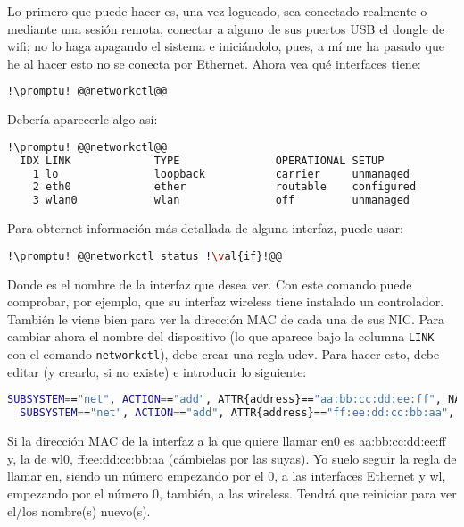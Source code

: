 Lo primero que puede hacer es, una vez logueado, sea conectado realmente o mediante una sesión remota, conectar
a alguno de sus puertos USB el dongle de wifi; no lo haga apagando el sistema e iniciándolo, pues, a mí me ha
pasado que he al hacer esto no se conecta por Ethernet. Ahora vea qué interfaces tiene:

\begin{lstlisting}[gobble=2,language=bash,style=bashinteract,escapechar=!]
  !\promptu! @@networkctl@@
\end{lstlisting}

\noindent Debería aparecerle algo así:

\begin{lstlisting}[gobble=2,language=bash,style=bashinteract,escapechar=!]
  !\promptu! @@networkctl@@
  IDX LINK             TYPE               OPERATIONAL SETUP
    1 lo               loopback           carrier     unmanaged
    2 eth0             ether              routable    configured
    3 wlan0            wlan               off         unmanaged
\end{lstlisting}

\noindent Para obternet información más detallada de alguna interfaz, puede usar:

\begin{lstlisting}[gobble=2,language=bash,style=bashinteract,escapechar=!]
  !\promptu! @@networkctl status !\val{if}!@@
\end{lstlisting}

\noindent Donde  es el nombre de la interfaz que desea ver. Con este comando puede comprobar, por
ejemplo, que su interfaz wireless tiene instalado un controlador. También le viene bien para ver la dirección
MAC de cada una de sus NIC. Para cambiar ahora el nombre del dispositivo (lo que aparece bajo la columna
\lstinline!LINK! con el comando \lstinline!networkctl!), debe crear una regla udev. Para hacer esto, debe editar
 (y crearlo, si no existe) e introducir lo siguiente:

\begin{lstlisting}[gobble=2,language=bash,style=bashinteract,escapechar=!]
  SUBSYSTEM=="net", ACTION=="add", ATTR{address}=="aa:bb:cc:dd:ee:ff", NAME="en0"
  SUBSYSTEM=="net", ACTION=="add", ATTR{address}=="ff:ee:dd:cc:bb:aa", NAME="wl0"
\end{lstlisting}

\noindent Si la dirección MAC de la interfaz a la que quiere llamar en0 es aa:bb:cc:dd:ee:ff y, la de wl0,
ff:ee:dd:cc:bb:aa (cámbielas por las suyas). Yo suelo seguir la regla de llamar en, siendo  un
número empezando por el 0, a las interfaces Ethernet y wl, empezando por el número 0, también, a las
wireless. Tendrá que reiniciar para ver el/los nombre(s) nuevo(s).

